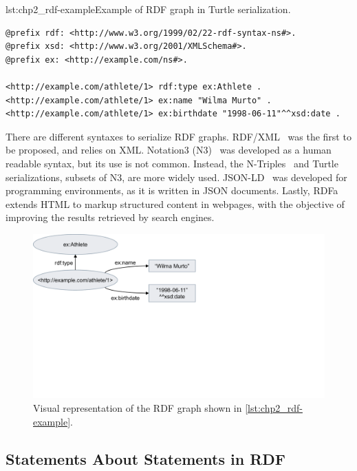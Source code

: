 \begin{minipage}{\textwidth}
\begin{captionedlisting}{lst:chp2_rdf-example}{Example of RDF graph in Turtle serialization.}
\centering
{\begin{lstlisting}[language=r2rml]
@prefix rdf: <http://www.w3.org/1999/02/22-rdf-syntax-ns#>.
@prefix xsd: <http://www.w3.org/2001/XMLSchema#>.
@prefix ex: <http://example.com/ns#>.

<http://example.com/athlete/1> rdf:type ex:Athlete .
<http://example.com/athlete/1> ex:name "Wilma Murto" .
<http://example.com/athlete/1> ex:birthdate "1998-06-11"^^xsd:date .
\end{lstlisting}}
\end{captionedlisting}
\end{minipage}

There are different syntaxes to serialize RDF graphs. RDF/XML~\parencite{rdfxml} was the first to be proposed, and relies on XML. Notation3 (N3)~\parencite{notation3} was developed as a human readable syntax, but its use is not common. Instead, the N-Triples~\parencite{ntriples} and Turtle~\parencite{turtle} serializations, subsets of N3, are more widely used. JSON-LD~\parencite{jsonld} was developed for programming environments, as it is written in JSON documents. Lastly, RDFa~\parencite{rdfa} extends HTML to markup structured content in webpages, with the objective of improving the results retrieved by search engines. 



\begin{figure}[t]
\centering
\includegraphics[width=0.6\linewidth]{figures/chp2_rdf-example.pdf}
\caption[RDF graph example]{Visual representation of the RDF graph shown in \cref{lst:chp2_rdf-example}.}
\label{fig:chp2_rdf-example}
\end{figure}

\subsection{Statements About Statements in RDF}
\label{sec:chp2_reifications}

